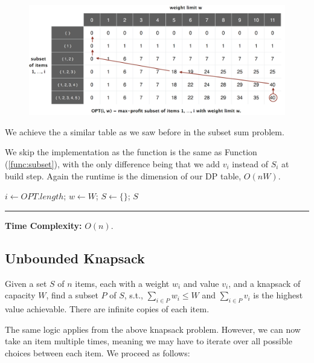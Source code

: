     \vspace{-1em}
    \begin{figure}[h]
       
        \includegraphics[width=.95\textwidth]{Sections/dp/knapsack.png}
    \end{figure}
    \label{fig:knapsack}

    \noindent
    We achieve the a similar table as we saw before in the subset sum problem.

    \newpage

    \noindent
    We skip the implementation as the function is the same as Function (\ref{func:subset}), with the only difference being that we add $v_i$ instead of $S_i$ at build step.
    Again the runtime is the dimension of our DP table, $O(nW)$.
    \begin{Func}
        \label{func:knapsack}

        \vspace{-.5em}
        \begin{algorithm}[H]
            $i \gets OPT.length$; $w \gets W$; $S \gets \{\}$; 
            \Return $S$\;
            
        \end{algorithm}
        \noindent
        \rule{\textwidth}{0.4pt}
        \textbf{Time Complexity:} $O(n)$.
    \end{Func}

\subsection{Unbounded Knapsack}
\begin{Def}

    Given a set $S$ of $n$ items, each with a weight $w_i$ and value $v_i$, and a knapsack of capacity $W$, find a subset
    $P$ of $S$, s.t., $\sum_{i\in P}w_i\leq W$ and $\sum_{i\in P}v_i$ is the highest value achievable. There are 
    infinite copies of each item.
\end{Def}
\noindent
The same logic applies from the above knapsack problem. However, we can now take an item multiple times, meaning 
we may have to iterate over all possible choices between each item. We proceed as follows:

